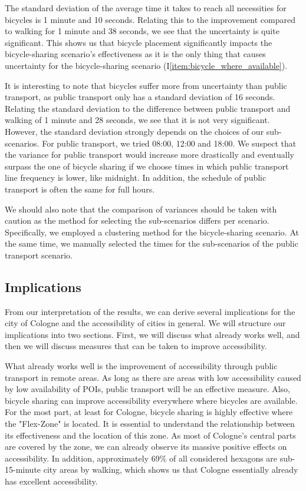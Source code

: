 The standard deviation of the average time it takes to reach all necessities for bicycles is 1 minute and 10 seconds. 
Relating this to the improvement compared to walking for 1 minute and 38 seconds, we see that the uncertainty is quite significant.
This shows us that bicycle placement significantly impacts the bicycle-sharing scenario's effectiveness as it is the only thing that causes uncertainty for the bicycle-sharing scenario (I\ref{item:bicycle_where_available}).

It is interesting to note that bicycles suffer more from uncertainty than public transport, as public transport only has a standard deviation of 16 seconds.
Relating the standard deviation to the difference between public transport and walking of 1 minute and 28 seconds, we see that it is not very significant.
However, the standard deviation strongly depends on the choices of our sub-scenarios. 
For public transport, we tried 08:00, 12:00 and 18:00.
We suspect that the variance for public transport would increase more drastically and eventually surpass the one of bicycle sharing if we choose times in which public transport line frequency is lower, like midnight.
In addition, the schedule of public transport is often the same for full hours.

We should also note that the comparison of variances should be taken with caution as the method for selecting the sub-scenarios differs per scenario.
Specifically, we employed a clustering method for the bicycle-sharing scenario.
At the same time, we manually selected the times for the sub-scenarios of the public transport scenario.

\subsection{Implications}
\label{sec:implications}

From our interpretation of the results, we can derive several implications for the city of Cologne and the accessibility of cities in general.
We will structure our implications into two sections. First, we will discuss what already works well, and then we will discuss measures that can be taken to improve accessibility.

What already works well is the improvement of accessibility through public transport in remote areas.
As long as there are areas with low accessibility caused by low availability of POIs, public transport will be an effective measure.
Also, bicycle sharing can improve accessibility everywhere where bicycles are available.
For the most part, at least for Cologne, bicycle sharing is highly effective where the "Flex-Zone" is located.
It is essential to understand the relationship between its effectiveness and the location of this zone.
As most of Cologne's central parts are covered by the zone, we can already observe its massive positive effects on accessibility.
In addition, approximately 69\% of all considered hexagons are sub-15-minute city areas by walking, which shows us that Cologne essentially already has excellent accessibility.

